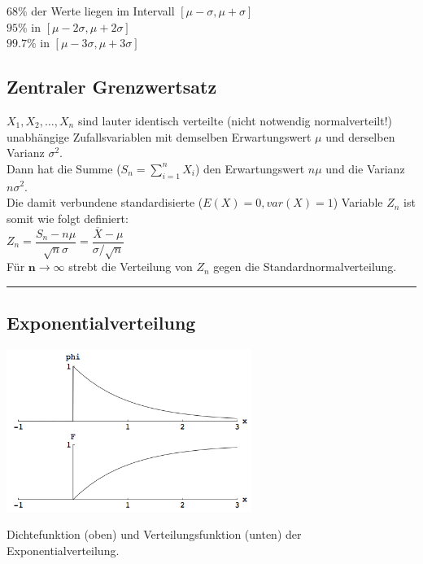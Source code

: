 	$ 68\% $ der Werte liegen im Intervall $[ \mu - \sigma, \mu + \sigma]$ \\ 
	$95\% $ in $[ \mu - 2\sigma, \mu + 2\sigma]$ \\
	$99.7\% $ in $[ \mu - 3\sigma, \mu + 3\sigma]$ \\
	
	
	\subsection{Zentraler Grenzwertsatz  }
      	$X_1, X_2, \ldots , X_n$ sind lauter identisch verteilte (nicht notwendig normalverteilt!)
      	unabhängige Zufallsvariablen mit demselben Erwartungswert $\mu$ und derselben Varianz $\sigma^2$.
      	\\ 
      	Dann hat die Summe ($S_n = \sum_{i=1}^n X_i$) den Erwartungswert $n \mu$ und die Varianz
      	$n \sigma^2$. \\
      	Die damit verbundene standardisierte ($E(X) = 0, var(X) = 1$) Variable $Z_n$ ist somit wie
      	folgt definiert: \\ $ Z_n = \dfrac{S_n - n \mu}{\sqrt{n} \sigma} = \dfrac{\overline{X} - \mu}{\sigma
      	/ \sqrt{n}}$
      	\\
      	Für $\boldsymbol{n \to \infty}$ strebt die Verteilung von $Z_n$ gegen die
      	Standardnormalverteilung. \\
        
\hrule

	\subsection{Exponentialverteilung }
		\begin{floatingfigure}[r]{8cm}
        \includegraphics[width=8cm]{./bilder/exponentialverteilung.png}
        \caption{Dichtefunktion (oben) und Verteilungsfunktion (unten) der
        Exponentialverteilung.} 		
		\end{floatingfigure}

